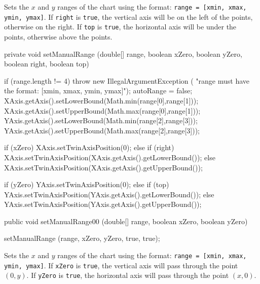 \begin{tabb}
    Sets the $x$ and $y$ ranges of the chart  using the format: \texttt{range =
  [xmin, xmax, ymin, ymax]}.
  If \texttt{right} is \texttt{true}, the vertical axis will be on the left of
 the points, otherwise on the right. If \texttt{top} is \texttt{true},
 the horizontal axis  will be under the points, otherwise above the points.
\end{tabb}
\begin{htmlonly}
\end{htmlonly}
\begin{code}\begin{hide}

   private void setManualRange (double[] range, boolean xZero, boolean yZero,
                                boolean right, boolean top) {
      if (range.length != 4)
         throw new IllegalArgumentException (
             "range must have the format: [xmin, xmax, ymin, ymax]");
      autoRange = false;
      XAxis.getAxis().setLowerBound(Math.min(range[0],range[1]));
      XAxis.getAxis().setUpperBound(Math.max(range[0],range[1]));
      YAxis.getAxis().setLowerBound(Math.min(range[2],range[3]));
      YAxis.getAxis().setUpperBound(Math.max(range[2],range[3]));

      if (xZero)
         XAxis.setTwinAxisPosition(0);
      else {
         if (right)
            XAxis.setTwinAxisPosition(XAxis.getAxis().getLowerBound());
         else
            XAxis.setTwinAxisPosition(XAxis.getAxis().getUpperBound());
      }

      if (yZero)
         YAxis.setTwinAxisPosition(0);
      else {
         if (top)
            YAxis.setTwinAxisPosition(YAxis.getAxis().getLowerBound());
         else
            YAxis.setTwinAxisPosition(YAxis.getAxis().getUpperBound());
      }
   }\end{hide}

   public void setManualRange00 (double[] range, boolean xZero, boolean yZero) \begin{hide} {
      setManualRange (range, xZero, yZero, true, true);
   }\end{hide}
\end{code}
\begin{tabb}
  Sets the $x$ and $y$ ranges of the chart using the format: \texttt{range =
  [xmin, xmax, ymin, ymax]}.
 If \texttt{xZero} is \texttt{true}, the vertical axis will pass through the
point $(0, y)$. If \texttt{yZero} is \texttt{true}, the horizontal axis
will pass through the point $(x, 0)$.
\end{tabb}

